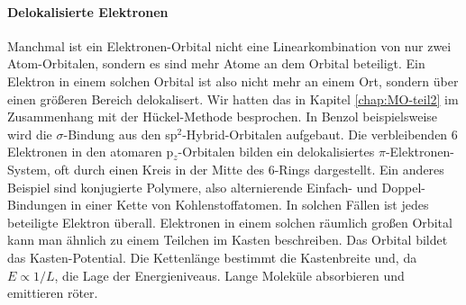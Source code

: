 \paragraph{Delokalisierte Elektronen} Manchmal ist ein Elektronen-Orbital nicht eine Linearkombination von nur zwei Atom-Orbitalen, sondern es sind mehr Atome an dem Orbital beteiligt. Ein Elektron in einem solchen Orbital ist also nicht mehr an einem Ort, sondern über einen größeren Bereich delokalisert. Wir hatten das in Kapitel  \ref{chap:MO-teil2} im Zusammenhang mit der Hückel-Methode besprochen. In Benzol beispielsweise wird die $\sigma$-Bindung aus den sp$^2$-Hybrid-Orbitalen aufgebaut. Die verbleibenden 6 Elektronen in den atomaren p$_z$-Orbitalen bilden ein delokalisiertes $\pi$-Elektronen-System, oft durch einen Kreis in der Mitte des 6-Rings dargestellt. Ein anderes Beispiel sind konjugierte Polymere, also alternierende Einfach- und Doppel-Bindungen in einer Kette von Kohlenstoffatomen. In solchen Fällen ist jedes beteiligte Elektron überall. Elektronen in einem solchen räumlich großen Orbital kann man ähnlich zu einem Teilchen im Kasten beschreiben. Das Orbital bildet das Kasten-Potential. Die Kettenlänge bestimmt die Kastenbreite und, da $E \propto 1 /L$, die Lage der Energieniveaus. Lange Moleküle absorbieren und emittieren röter.






\printbibliography[segment=\therefsegment,heading=subbibliography]
